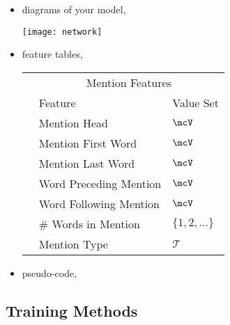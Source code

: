 \documentclass[11pt]{article}
\begin{document}
\begin{itemize}
\item diagrams of your model,

  \begin{center}
    \texttt{[image: network]}
  \end{center}
\item feature tables,

  \begin{center}
    \begin{tabular}{@{}lll@{}}
      \toprule
      &\multicolumn{2}{c}{Mention Features  } \\
      & Feature & Value Set\\
      \midrule
      & Mention Head & $\mcV$ \\
      & Mention First Word & $\mcV$ \\
      & Mention Last Word & $\mcV$ \\
      & Word Preceding Mention & $\mcV$ \\
      & Word Following Mention & $\mcV$\\
      & \# Words in Mention & $\{1, 2, \ldots \}$ \\
      & Mention Type & $\mathcal{T}$ \\
      \bottomrule
    \end{tabular}
  \end{center}

\item pseudo-code,

  \begin{algorithmic}[1]
    \EndFor{}
    \EndFor{}
    \EndFor{}
    \EndFor{}
    \EndProcedure{}
  \end{algorithmic}

\end{itemize}

\subsection{Training Methods}
\end{document}
